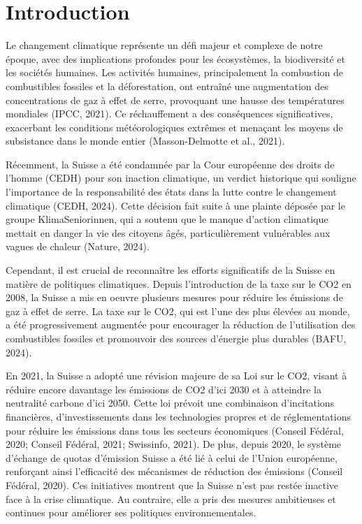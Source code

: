 \section{Introduction}
\label{sec:introduction}

Le changement climatique représente un défi majeur et complexe de notre époque, avec des implications profondes pour les écosystèmes, la biodiversité et les sociétés humaines. Les activités humaines, principalement la combustion de combustibles fossiles et la déforestation, ont entraîné une augmentation des concentrations de gaz à effet de serre, provoquant une hausse des températures mondiales (IPCC, 2021)\supercite{ipcc_2021}. Ce réchauffement a des conséquences significatives, exacerbant les conditions météorologiques extrêmes et menaçant les moyens de subsistance dans le monde entier (Masson-Delmotte et al., 2021)\supercite{ipcc_2021}.



Récemment, la Suisse a été condamnée par la Cour européenne des droits de l'homme (CEDH) pour son inaction climatique, un verdict historique qui souligne l'importance de la responsabilité des états dans la lutte contre le changement climatique (CEDH, 2024)\supercite{CEDH2024}. Cette décision fait suite à une plainte déposée par le groupe KlimaSeniorinnen, qui a soutenu que le manque d'action climatique mettait en danger la vie des citoyens âgés, particulièrement vulnérables aux vagues de chaleur (Nature, 2024)\supercite{nature2024}.

Cependant, il est crucial de reconnaître les efforts significatifs de la Suisse en matière de politiques climatiques. Depuis l'introduction de la taxe sur le CO2 en 2008, la Suisse a mis en oeuvre plusieurs mesures pour réduire les émissions de gaz à effet de serre. La taxe sur le CO2, qui est l'une des plus élevées au monde, a été progressivement augmentée pour encourager la réduction de l'utilisation des combustibles fossiles et promouvoir des sources d'énergie plus durables (BAFU, 2024)\supercite{bafu2024}.


En 2021, la Suisse a adopté une révision majeure de sa Loi sur le CO2, visant à réduire encore davantage les émissions de CO2 d'ici 2030 et à atteindre la neutralité carbone d'ici 2050. Cette loi prévoit une combinaison d'incitations financières, d'investissements dans les technologies propres et de réglementations pour réduire les émissions dans tous les secteurs économiques (Conseil Fédéral, 2020; Conseil Fédéral, 2021; Swissinfo, 2021)\supercite{adminch2020,adminch2021,swissinfo2021}. De plus, depuis 2020, le système d'échange de quotas d'émission Suisse a été lié à celui de l'Union européenne, renforçant ainsi l'efficacité des mécanismes de réduction des émissions (Conseil Fédéral, 2020)\supercite{adminch2020}. Ces initiatives montrent que la Suisse n'est pas restée inactive face à la crise climatique. Au contraire, elle a pris des mesures ambitieuses et continues pour améliorer ses politiques environnementales.





